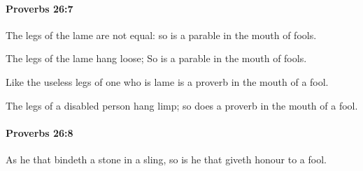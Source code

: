 		\paragraph{Proverbs 26:7} %
			\label{PROVERBS-26-7}

			The legs of the lame are not equal: so is a parable in the mouth of fools.

			\begin{versebox}
					\item[BHS] 
					\item[ASV] The legs of the lame hang loose; So is a parable in the mouth of fools.
					\item[NIV] Like the useless legs of one who is lame is a proverb in the mouth of a fool.
					\item[NRSV] The legs of a disabled person hang limp; so does a proverb in the mouth of a fool.
			\end{versebox}

		\paragraph{Proverbs 26:8} %
			\label{PROVERBS-26-8}

			As he that bindeth a stone in a sling, so is he that giveth honour to a fool.

